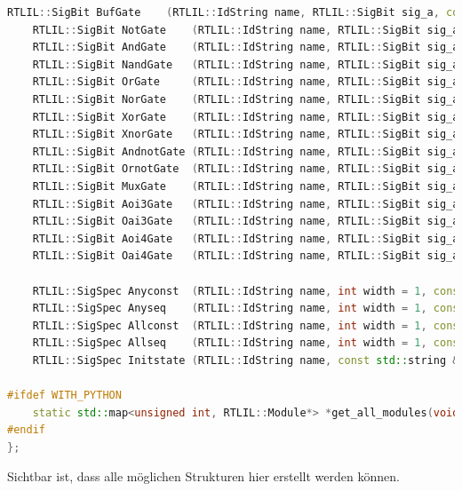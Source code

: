 \documentclass[11pt]{report}
\begin{document}
\begin{lstlisting}[language=C++]
	RTLIL::SigBit BufGate    (RTLIL::IdString name, RTLIL::SigBit sig_a, const std::string &src = "");
	RTLIL::SigBit NotGate    (RTLIL::IdString name, RTLIL::SigBit sig_a, const std::string &src = "");
	RTLIL::SigBit AndGate    (RTLIL::IdString name, RTLIL::SigBit sig_a, RTLIL::SigBit sig_b, const std::string &src = "");
	RTLIL::SigBit NandGate   (RTLIL::IdString name, RTLIL::SigBit sig_a, RTLIL::SigBit sig_b, const std::string &src = "");
	RTLIL::SigBit OrGate     (RTLIL::IdString name, RTLIL::SigBit sig_a, RTLIL::SigBit sig_b, const std::string &src = "");
	RTLIL::SigBit NorGate    (RTLIL::IdString name, RTLIL::SigBit sig_a, RTLIL::SigBit sig_b, const std::string &src = "");
	RTLIL::SigBit XorGate    (RTLIL::IdString name, RTLIL::SigBit sig_a, RTLIL::SigBit sig_b, const std::string &src = "");
	RTLIL::SigBit XnorGate   (RTLIL::IdString name, RTLIL::SigBit sig_a, RTLIL::SigBit sig_b, const std::string &src = "");
	RTLIL::SigBit AndnotGate (RTLIL::IdString name, RTLIL::SigBit sig_a, RTLIL::SigBit sig_b, const std::string &src = "");
	RTLIL::SigBit OrnotGate  (RTLIL::IdString name, RTLIL::SigBit sig_a, RTLIL::SigBit sig_b, const std::string &src = "");
	RTLIL::SigBit MuxGate    (RTLIL::IdString name, RTLIL::SigBit sig_a, RTLIL::SigBit sig_b, RTLIL::SigBit sig_s, const std::string &src = "");
	RTLIL::SigBit Aoi3Gate   (RTLIL::IdString name, RTLIL::SigBit sig_a, RTLIL::SigBit sig_b, RTLIL::SigBit sig_c, const std::string &src = "");
	RTLIL::SigBit Oai3Gate   (RTLIL::IdString name, RTLIL::SigBit sig_a, RTLIL::SigBit sig_b, RTLIL::SigBit sig_c, const std::string &src = "");
	RTLIL::SigBit Aoi4Gate   (RTLIL::IdString name, RTLIL::SigBit sig_a, RTLIL::SigBit sig_b, RTLIL::SigBit sig_c, RTLIL::SigBit sig_d, const std::string &src = "");
	RTLIL::SigBit Oai4Gate   (RTLIL::IdString name, RTLIL::SigBit sig_a, RTLIL::SigBit sig_b, RTLIL::SigBit sig_c, RTLIL::SigBit sig_d, const std::string &src = "");

	RTLIL::SigSpec Anyconst  (RTLIL::IdString name, int width = 1, const std::string &src = "");
	RTLIL::SigSpec Anyseq    (RTLIL::IdString name, int width = 1, const std::string &src = "");
	RTLIL::SigSpec Allconst  (RTLIL::IdString name, int width = 1, const std::string &src = "");
	RTLIL::SigSpec Allseq    (RTLIL::IdString name, int width = 1, const std::string &src = "");
	RTLIL::SigSpec Initstate (RTLIL::IdString name, const std::string &src = "");

#ifdef WITH_PYTHON
	static std::map<unsigned int, RTLIL::Module*> *get_all_modules(void);
#endif
};
\end{lstlisting}
Sichtbar ist, dass alle möglichen Strukturen hier erstellt werden können.
\end{document}
